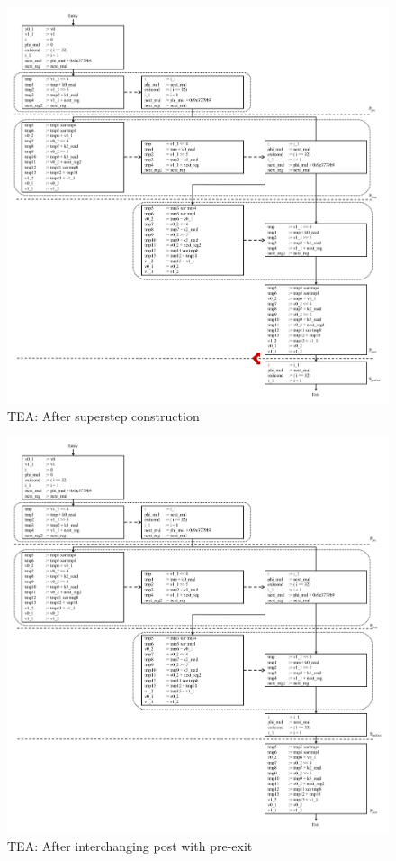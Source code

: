 \begin{figure}[H]
\begin{center}
\includegraphics[width=5.5in]{fig-proposal/tea-after-superstep-construction}
\caption{TEA: After superstep construction}
\label{fig:tea-after-superstep-construction}
\end{center}
\end{figure}

\begin{figure}[H]
\begin{center}
\includegraphics[width=5.5in]{fig-proposal/tea-after-interchange-pre-post}
\caption{TEA: After interchanging post with pre-exit}
\label{fig:tea-after-interchange-post-exit}
\end{center}
\end{figure}

